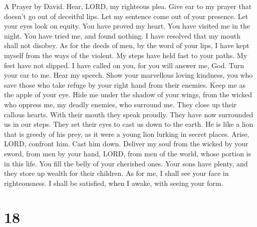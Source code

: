 A Prayer by David.  Hear, LORD, my righteous plea. Give ear
to my prayer that doesn't go out of deceitful lips.  Let my
sentence come out of your presence. Let your eyes look on equity.
 You have proved my heart. You have visited me in the night.
You have tried me, and found nothing. I have resolved that my mouth
shall not disobey.  As for the deeds of men, by the word of
your lips, I have kept myself from the ways of the violent. 
My steps have held fast to your paths. My feet have not slipped.
 I have called on you, for you will answer me, God. Turn
your ear to me. Hear my speech.  Show your marvellous loving
kindness, you who save those who take refuge by your right hand from
their enemies.  Keep me as the apple of your eye. Hide me
under the shadow of your wings,  from the wicked who oppress
me, my deadly enemies, who surround me.  They close up
their callous hearts. With their mouth they speak proudly. 
They have now surrounded us in our steps. They set their eyes to cast us
down to the earth.  He is like a lion that is greedy of his
prey, as it were a young lion lurking in secret places. 
Arise, LORD, confront him. Cast him down. Deliver my soul from the
wicked by your sword,  from men by your hand, LORD, from
men of the world, whose portion is in this life. You fill the belly of
your cherished ones. Your sons have plenty, and they store up wealth for
their children.  As for me, I shall see your face in
righteousness. I shall be satisfied, when I awake, with seeing your
form.

\hypertarget{section-17}{%
\section{18}\label{section-17}}

